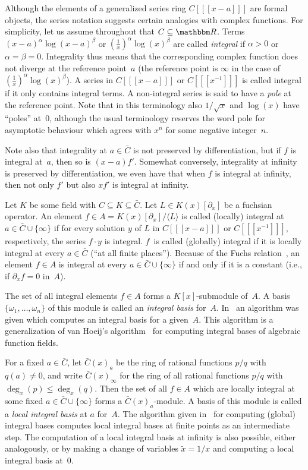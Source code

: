 \documentclass{sig-alternate}
\def\<#1>{\langle#1\rangle}
\let\set\mathbbm
\begin{document}
Although the elements of a generalized series ring $C[[[x-a]]]$ are formal
objects, the series notation suggests certain analogies with complex
functions.  For simplicity, let us assume throughout that $C\subseteq\set
R$. Terms $(x-a)^\alpha\log(x-a)^\beta$ or $(\tfrac1x)^\alpha\log(x)^\beta$ are
called \emph{integral} if $\alpha>0$ or $\alpha=\beta=0$.
Integrality thus means that the corresponding complex
function does not diverge at the reference point~$a$ (the reference point is
$\infty$ in the case of $(\tfrac1x)^\alpha\log(x)^\beta$). A series in
$C[[[x-a]]]$ or $C[[[x^{-1}]]]$ is called integral if it only contains integral
terms. A non-integral series is said to have a \emph{pole} at the reference
point.  Note that in this terminology also $1/\sqrt{x}$ and $\log(x)$ have
``poles'' at~$0$, although the usual terminology reserves the word pole for
asymptotic behaviour which agrees with $x^n$ for some negative integer~$n$.

Note also that integrality at $a\in\bar C$ is not preserved by differentiation,
but if $f$ is integral at~$a$, then so is $(x-a)f'$. Somewhat conversely,
integrality at infinity is preserved by differentiation, we even have that
when $f$ is integral at infinity, then not only $f'$ but also $xf'$ is
integral at infinity.

Let $K$ be some field with $C\subseteq K\subseteq\bar C$.
Let $L\in K(x)[\partial_x]$ be a fuchsian operator. An element $f\in A=K(x)[\partial_x]/\<L>$
is called (locally) integral at $a\in\bar C\cup\{\infty\}$ if for every solution $y$
of $L$ in $C[[[x-a]]]$ or $C[[[x^{-1}]]]$, respectively, the series $f\cdot y$ is
integral. $f$~is called (globally) integral if it is locally integral at every
$a\in\bar C$ (``at all finite places''). Because of the Fuchs relation~\cite{ince26}, an
element $f\in A$ is integral at every $a\in\bar C\cup\{\infty\}$ if and only if it
is a constant (i.e., if $\partial_xf=0$ in~$A$).

The set of all integral elements $f\in A$ forms a $K[x]$-submodule of~$A$.
A basis $\{\omega_1,\dots,\omega_n\}$ of this module is called an \emph{integral basis}
for~$A$. In~\cite{kauers15b} an algorithm was given which computes an integral basis
for a given~$A$. This algorithm is a generalization of van Hoeij's
algorithm~\cite{vanHoeij94} for computing integral bases of algebraic function
fields.

For a fixed $a\in\bar C$, let $\bar C(x)_a$ be the ring of rational functions $p/q$
with $q(a)\neq0$, and write $\bar C(x)_\infty$ for the ring of all
rational functions $p/q$ with $\deg_x(p)\leq\deg_x(q)$.
Then the set of all $f\in A$ which are locally integral at some
fixed $a\in\bar C\cup\{\infty\}$ forms a $\bar C(x)_a$-module. A basis of this module is
called a \emph{local integral basis} at $a$ for~$A$. The algorithm given in~\cite{kauers15b}
for computing (global) integral bases computes local integral bases at finite
points as an intermediate step. The computation of a local integral basis at
infinity is also possible, either analogously, or by making a change of
variables $\tilde x=1/x$ and computing a local integral basis at~$0$.
\end{document}
